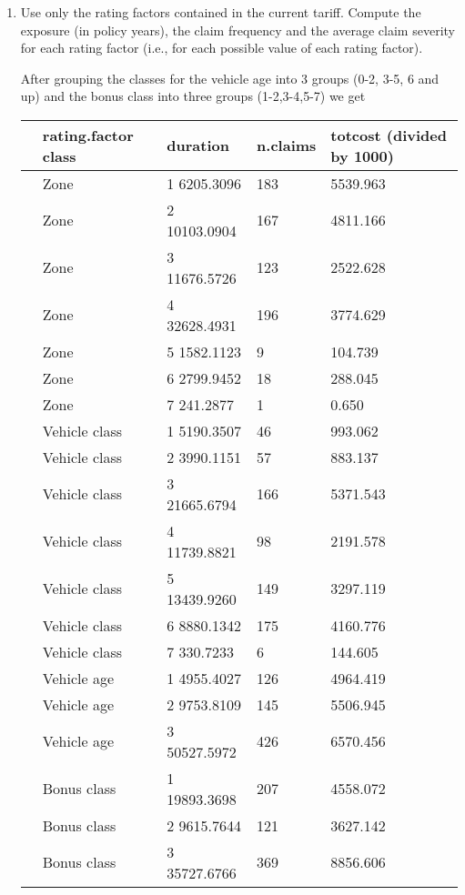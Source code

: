 \documentclass[11pt]{article}
\begin{document}
\begin{enumerate}
\newpage
\item Use only the rating factors contained in the current tariff. Compute the exposure (in policy years), the claim frequency and the average claim severity for each rating factor (i.e., for each possible value of each rating factor).

 After grouping the classes for the vehicle age into 3 groups  (0-2, 3-5, 6 and up) and the bonus class into three groups (1-2,3-4,5-7) we get

\begin{tabular}{lllll}
\hline
      &rating.factor class  & duration &n.claims & totcost (divided by 1000) \\
      \hline           
      &Zone    & 1  6205.3096    &  183 &  5539.963\\
           &Zone &    2 10103.0904   &   167 &   4811.166\\
           &Zone   &  3 11676.5726   &   123   & 2522.628\\
           &Zone    & 4 32628.4931   &   196   & 3774.629\\
           &Zone    & 5  1582.1123    &    9    & 104.739\\
           &Zone    & 6  2799.9452    &   18   &  288.045\\
           &Zone    & 7   241.2877      &  1     &  0.650\\
 &Vehicle class  &   1  5190.3507     &  46 &    993.062\\
 &Vehicle class   &  2  3990.1151     &  57   &  883.137\\
 &Vehicle class   &  3 21665.6794    &  166  &  5371.543\\
 &Vehicle class   &  4 11739.8821    &   98   & 2191.578\\
 &Vehicle class   &  5 13439.9260   &   149  &  3297.119\\
 &Vehicle class    & 6  8880.1342    &  175   & 4160.776\\
 &Vehicle class   &  7   330.7233      &  6   & 144.605\\
  & Vehicle age   &  1  4955.4027    &  126  &  4964.419\\
   &Vehicle age   &  2  9753.8109    &  145  &  5506.945\\
   &Vehicle age   &  3 50527.5972    &  426 &   6570.456\\
   &Bonus class   &  1 19893.3698   &   207  &  4558.072\\
   &Bonus class   &  2  9615.7644    &  121   & 3627.142\\
   &Bonus class   &  3 35727.6766 &     369   & 8856.606\\
\hline
\end{tabular}


\end{enumerate}
\end{document}
